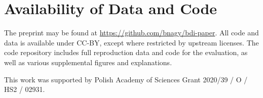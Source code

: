 \documentclass[
    hf
]{ceurart}
\begin{document}
\section{Availability of Data and Code}\label{sec:data}

The preprint may be found at \url{https://github.com/bnagy/bdi-paper}. All code
and data is available under CC-BY, except where restricted by upstream licenses.
The code repository includes full reproduction data and code for the evaluation,
as well as various supplemental figures and explanations.

\FloatBarrier

\begin{acknowledgments}
    This work was supported by Polish Academy of Sciences Grant
    2020/39 / O / HS2 / 02931.
\end{acknowledgments}



\appendix
\onecolumn
\end{document}
